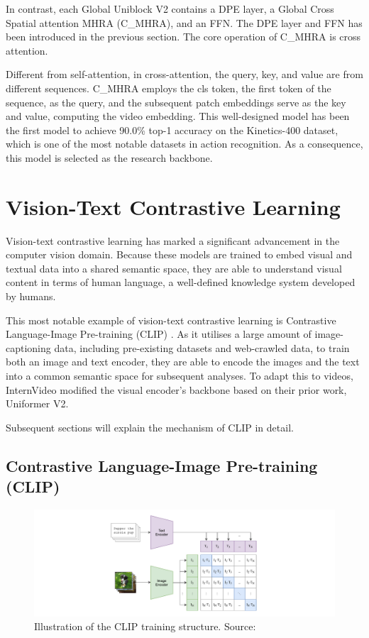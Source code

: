 In contrast, each Global Uniblock V2 contains a DPE layer, a Global Cross Spatial attention MHRA (C\_MHRA), and an FFN. The DPE layer and FFN has been introduced in the previous section. The core operation of C\_MHRA is cross attention. 

Different from self-attention, in cross-attention, the query, key, and value are from different sequences. C\_MHRA employs the cls token, the first token of the sequence, as the query, and the subsequent patch embeddings serve as the key and value, computing the video embedding. This well-designed model has been the first model to achieve 90.0\% top-1 accuracy on the Kinetics-400 \parencite{kay2017kinetics} dataset, which is one of the most notable datasets in action recognition. As a consequence, this model is selected as the research backbone.

\section{Vision-Text Contrastive Learning}
Vision-text contrastive learning has marked a significant advancement in the computer vision domain. Because these models are trained to embed visual and textual data into a shared semantic space, they are able to understand visual content in terms of human language, a well-defined knowledge system developed by humans. 

This most notable example of vision-text contrastive learning is Contrastive Language-Image Pre-training (CLIP) \parencite{radford2021learning}. As it utilises a large amount of image-captioning data, including pre-existing datasets and web-crawled data, to train both an image and text encoder, they are able to encode the images and the text into a common semantic space for subsequent analyses. To adapt this to videos, InternVideo modified the visual encoder's backbone \parencite{wang2022internvideo} based on their prior work, Uniformer V2.

Subsequent sections will explain the mechanism of CLIP in detail.

\subsection{Contrastive Language-Image Pre-training (CLIP)}
\begin{figure}[ht]
    \centering
    \includegraphics[width=1.0\textwidth]{assets/charts_rw/CLIP_loss}
    \caption[Training Structure of CLIP]{Illustration of the CLIP training structure. Source: \parencite{radford2021learning}}
    \label{fig:cliplossstructure}
\end{figure}


